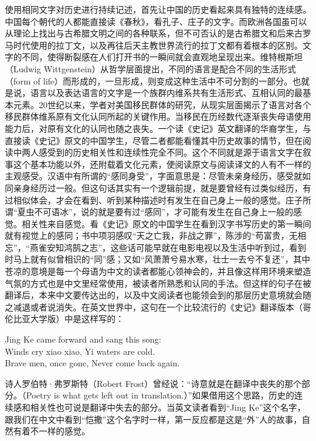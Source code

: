 
使用相同文字对历史进行持续记述，首先让中国的历史看起来具有独特的连续感。中国每个朝代的人都能直接读《春秋》，看孔子、庄子的文字。而欧洲各国虽可以从理论上找出与古希腊文明之间的各种联系，但不可否认的是古希腊文和后来古罗马时代使用的拉丁文，以及再往后天主教世界流行的拉丁文都有着根本的区别。文字的不同，使得断裂感在人们打开书的一瞬间就会直观地呈现出来。维特根斯坦（Ludwig Wittgenstein）从哲学层面提出，不同的语言是配合不同的生活形式（form of life）而形成的，一旦形成，则变成这种生活中不可分割的一部分。也就是说，语言以及表达语言的文字是一个族群内维系共有生活形式、互相认同的最基本元素。20世纪以来，学者对美国移民群体的研究，从现实层面揭示了语言对各个移民群体维系原有文化认同所起的关键作用。当移民在历经数代逐渐丧失母语使用能力后，对原有文化的认同也随之丧失。一个读《史记》英文翻译的华裔学生，与直接读《史记》原文的中国学生，尽管二者都能看懂其中历史故事的情节，但在阅读中两人感受到的历史相关性和连续性完全不同。这个不同就是源于语言文字在叙事这个基本功能以外，还附载着文化元素，使阅读原文与阅读译文的人有不一样的主观感受。汉语中有所谓的“感同身受”，字面意思是：尽管未亲身经历，感受就如同亲身经历过一般。但这句话其实有一个逻辑前提，就是要曾经有过类似经历，有过相似体会，才会在看到、听到某种描述时有发生在自己身上一般的感觉。庄子所谓“夏虫不可语冰”，说的就是要有过“感同”，才可能有发生在自己身上一般的感觉。相关性来自感觉。看《史记》原文的中国学生在看到汉字书写历史的第一瞬间就有视觉上的感同；书中项羽感叹“天之亡我，非战之罪”，陈涉的“苟富贵，无相忘”，“燕雀安知鸿鹄之志”，这些话可能早就在电影电视以及生活中听到过，看到时马上就有似曾相识的“同”感；又如“风萧萧兮易水寒，壮士一去兮不复还”，其中苍凉的意境是每一个母语为中文的读者都能心领神会的，并且像这样用环境来塑造气氛的方式也是中文里经常使用，被读者所熟悉和认同的手法。但这样的句子在被翻译后，本来中文要传达出的，以及中文阅读者也能领会到的那层历史意境就会随之减退或者说消失。在英文世界中，这句在一个比较流行的《史记》翻译版本（哥伦比亚大学版）中是这样写的：



\begin{bookquote}
Jing Ke came forward and sang this song:\\
Winds cry xiao xiao, Yi waters are cold.\\
Brave men, once gone, Never come back again.
\end{bookquote}


诗人罗伯特·弗罗斯特（Robert Frost）曾经说：“诗意就是在翻译中丧失的那个部分。（Poetry is what gets left out in translation.）”如果借用这个思路，历史的连续感和相关性也可说是翻译中失去的部分。当英文读者看到“Jing Ke”这个名字，跟我们在中文中看到“恺撒”这个名字时一样，第一反应都是这是“外”人的故事，自然有着不一样的感觉。


